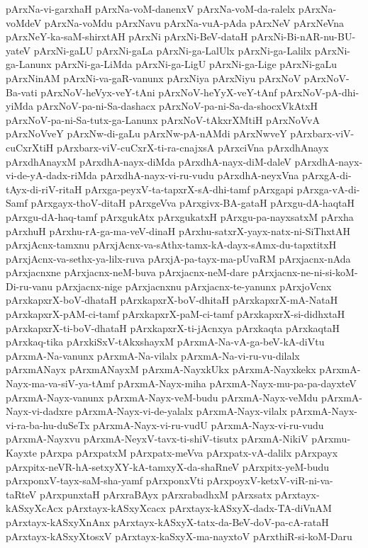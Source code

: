 {pArxNa-vi-garxhaH
pArxNa-voM-danenxV
pArxNa-voM-da-ralelx
pArxNa-voMdeV
pArxNa-voMdu
pArxNavu
pArxNa-vuA-pAda
pArxNeV
pArxNeVna
pArxNeY-ka-saM-shirxtAH
pArxNi
pArxNi-BeV-dataH
pArxNi-Bi-nAR-nu-BU-yateV
pArxNi-gaLU
pArxNi-gaLa
pArxNi-ga-LalUlx
pArxNi-ga-Lalilx
pArxNi-ga-Lanunx
pArxNi-ga-LiMda
pArxNi-ga-LigU
pArxNi-ga-Lige
pArxNi-gaLu
pArxNinAM
pArxNi-va-gaR-vanunx
pArxNiya
pArxNiyu
pArxNoV
pArxNoV-Ba-vati
pArxNoV-heVyx-veY-tAni
pArxNoV-heYyX-veY-tAnf
pArxNoV-pA-dhi-yiMda
pArxNoV-pa-ni-Sa-dashacx
pArxNoV-pa-ni-Sa-da-shocxVkAtxH
pArxNoV-pa-ni-Sa-tutx-ga-Lanunx
pArxNoV-tAkxrXMtiH
pArxNoVvA
pArxNoVveY
pArxNw-di-gaLu
pArxNw-pA-nAMdi
pArxNwveY
pArxbarx-viV-cuCxrXtiH
pArxbarx-viV-cuCxrX-ti-ra-cnajxsA
pArxciVna
pArxdhAnayx
pArxdhAnayxM
pArxdhA-nayx-diMda
pArxdhA-nayx-diM-daleV
pArxdhA-nayx-vi-de-yA-dadx-riMda
pArxdhA-nayx-vi-ru-vudu
pArxdhA-neyxVna
pArxgA-di-tAyx-di-riV-ritaH
pArxga-peyxV-ta-tapxrX-sA-dhi-tamf
pArxgapi
pArxga-vA-di-Samf
pArxgayx-thoV-ditaH
pArxgeVva
pArxgivx-BA-gataH
pArxgu-dA-haqtaH
pArxgu-dA-haq-tamf
pArxgukAtx
pArxgukatxH
pArxgu-pa-nayxsatxM
pArxha
pArxhuH
pArxhu-rA-ga-ma-veV-dinaH
pArxhu-satxrX-yayx-natx-ni-SiThxtAH
pArxjAcnx-tamxnu
pArxjAcnx-va-sAthx-tamx-kA-dayx-sAmx-du-tapxtitxH
pArxjAcnx-va-sethx-ya-lilx-ruva
pArxjA-pa-tayx-ma-pUvaRM
pArxjacnx-nAda
pArxjacnxne
pArxjacnx-neM-buva
pArxjacnx-neM-dare
pArxjacnx-ne-ni-si-koM-Di-ru-vanu
pArxjacnx-nige
pArxjacnxnu
pArxjacnx-te-yanunx
pArxjoVcnx
pArxkapxrX-boV-dhataH
pArxkapxrX-boV-dhitaH
pArxkapxrX-mA-NataH
pArxkapxrX-pAM-ci-tamf
pArxkapxrX-paM-ci-tamf
pArxkapxrX-si-didhxtaH
pArxkapxrX-ti-boV-dhataH
pArxkapxrX-ti-jAcnxya
pArxkaqta
pArxkaqtaH
pArxkaq-tika
pArxkiSxV-tAkxshayxM
pArxmA-Na-vA-ga-beV-kA-diVtu
pArxmA-Na-vanunx
pArxmA-Na-vilalx
pArxmA-Na-vi-ru-vu-dilalx
pArxmANayx
pArxmANayxM
pArxmA-NayxkUkx
pArxmA-Nayxkekx
pArxmA-Nayx-ma-va-siV-ya-tAmf
pArxmA-Nayx-miha
pArxmA-Nayx-mu-pa-pa-dayxteV
pArxmA-Nayx-vanunx
pArxmA-Nayx-veM-budu
pArxmA-Nayx-veMdu
pArxmA-Nayx-vi-dadxre
pArxmA-Nayx-vi-de-yalalx
pArxmA-Nayx-vilalx
pArxmA-Nayx-vi-ra-ba-hu-duSeTx
pArxmA-Nayx-vi-ru-vudU
pArxmA-Nayx-vi-ru-vudu
pArxmA-Nayxvu
pArxmA-NeyxV-tavx-ti-shiV-tisutx
pArxmA-NikiV
pArxmu-Kayxte
pArxpa
pArxpatxM
pArxpatx-meVva
pArxpatx-vA-dalilx
pArxpayx
pArxpitx-neVR-hA-setxyXY-kA-tamxyX-da-shaRneV
pArxpitx-yeM-budu
pArxponxV-tayx-saM-sha-yamf
pArxponxVti
pArxpoyxV-ketxV-viR-ni-va-taRteV
pArxpunxtaH
pArxraBAyx
pArxrabadhxM
pArxsatx
pArxtayx-kASxyXcAcx
pArxtayx-kASxyXcacx
pArxtayx-kASxyX-dadx-TA-diVnAM
pArxtayx-kASxyXnAnx
pArxtayx-kASxyX-tatx-da-BeV-doV-pa-cA-rataH
pArxtayx-kASxyXtosxV
pArxtayx-kaSxyX-ma-nayxtoV
pArxthiR-si-koM-Daru
}
